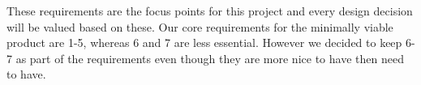 These requirements are the focus points for this project and every design decision will be valued based on these. Our core requirements for the minimally viable product are 1-5, whereas 6 and 7 are less essential. However we decided to keep 6-7 as part of the requirements even though they are more nice to have then need to have.







